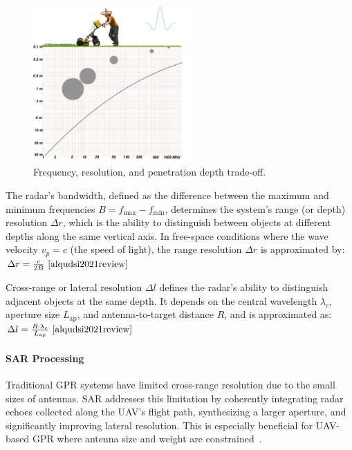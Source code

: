 \begin{figure}[H]
    \centering
    \includegraphics[width=6cm]{figs/Huirui/freq_tradeoff.png}
    \caption{Frequency, resolution, and penetration depth trade-off\protect\footnotemark.}
    \label{fig:freq_tradeoff}
\end{figure}



The radar’s bandwidth, defined as the difference between the maximum and minimum frequencies $B = f_{\text{max}} - f_{\text{min}}$, determines the system’s range (or depth) resolution $\Delta r$, which is the ability to distinguish between objects at different depths along the same vertical axis. In free-space conditions where the wave velocity $v_p = c$ (the speed of light), the range resolution $\Delta r$ is approximated by: \(\Delta r = \frac{c}{2B}~\cite{alqudsi2021review}\)

Cross-range or lateral resolution $\Delta l$ defines the radar’s ability to distinguish adjacent objects at the same depth. It depends on the central wavelength $\lambda_c$, aperture size $L_{\text{ap}}$, and antenna-to-target distance $R$, and is approximated as: \(\Delta l = \frac{R \cdot \lambda_c}{L_{\text{ap}}}~\cite{alqudsi2021review}\)



\paragraph{\gls{SAR} Processing}

Traditional \gls{GPR} systems have limited cross-range resolution due to the small sizes of antennas. \gls{SAR} addresses this limitation by coherently integrating radar echoes collected along the \gls{UAV}’s flight path, synthesizing a larger aperture, and significantly improving lateral resolution. This is especially beneficial for \gls{UAV}-based \gls{GPR} where antenna size and weight are constrained~\cite{alqudsi2021review}.

